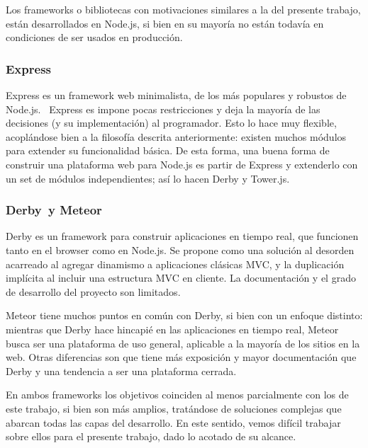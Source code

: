 \documentclass[doc,helv,longtable]{article}
\begin{document}
Los frameworks o bibliotecas con motivaciones similares a la del presente trabajo, están desarrollados en Node.js, si bien en su mayoría no están todavía en condiciones de ser usados en producción\cite{nodeodd}\cite{nodefws}.

\subsubsection{Express}
Express\cite{express} es un framework web minimalista, de los más populares y robustos de Node.js.  Express es impone pocas restricciones y deja la mayoría de las decisiones (y su implementación) al programador\cite{nodefws}. Esto lo hace muy flexible, acoplándose bien a la filosofía descrita anteriormente: existen muchos módulos para extender su funcionalidad básica. De esta forma, una buena forma de construir una plataforma web para Node.js es partir de Express y extenderlo con un set de módulos independientes; así lo hacen Derby y Tower.js\cite{tower}.

\subsubsection{Derby y Meteor}
Derby es un framework para construir aplicaciones en tiempo real, que funcionen tanto en el browser como en Node.js. Se propone como una solución al desorden acarreado al agregar dinamismo a aplicaciones clásicas MVC, y la duplicación implícita al incluir una estructura MVC en cliente\cite{derby}. La documentación y el grado de desarrollo del proyecto son limitados\cite{nodefws}.

Meteor\cite{meteor} tiene muchos puntos en común con Derby, si bien con un enfoque distinto: mientras que Derby hace hincapié en las aplicaciones en tiempo real, Meteor busca ser una plataforma de uso general, aplicable a la mayoría de los sitios en la web\cite{derbymeteor}. Otras diferencias son que tiene más exposición y mayor documentación que Derby\cite{derbyrant1} y una tendencia a ser una plataforma cerrada\cite{derbyrant2}.

En ambos frameworks los objetivos coinciden al menos parcialmente con los de este trabajo, si bien son más amplios, tratándose de soluciones complejas que abarcan todas las capas del desarrollo. En este sentido, vemos difícil trabajar sobre ellos para el presente trabajo, dado lo acotado de su alcance.
\end{document}
